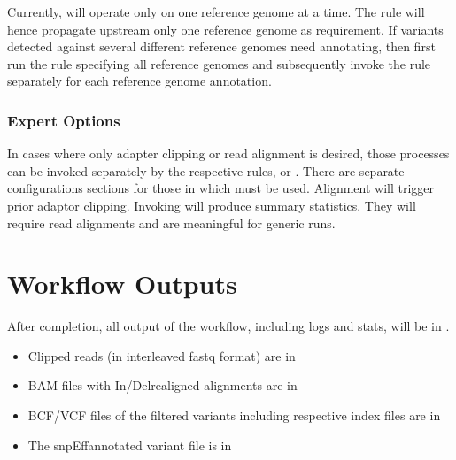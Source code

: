 \documentclass[letterpaper,10pt,english]{sphinxmanual}
\begin{document}
Currently,  will operate only on one reference genome at a time. The rule will hence propagate upstream only one reference genome as requirement. If variants detected against several different reference genomes need annotating, then first run the  rule specifying all reference genomes and subsequently invoke the  rule separately for each reference genome annotation.


\subsection{Expert Options}
\label{\detokenize{index:expert-options}}
In cases where only adapter clipping or read alignment is desired, those processes can be invoked separately by the respective rules,   or . There are separate configurations sections for those in  which must be used. Alignment will trigger prior adaptor clipping.
Invoking  will produce summary statistics. They will require read alignments and are meaningful for generic  runs.


\chapter{Workflow Outputs}
\label{\detokenize{index:workflow-outputs}}
After completion, all output of the workflow, including logs and stats, will be in .
\begin{itemize}
\item {} 
Clipped reads (in interleaved fastq format) are in 

\item {} 
BAM files with In/Del\sphinxhyphen{}realigned alignments are in 

\item {} 
BCF/VCF files of the filtered variants including respective index files are in 

\item {} 
The snpEff\sphinxhyphen{}annotated variant file is in 

\end{itemize}
\end{document}
